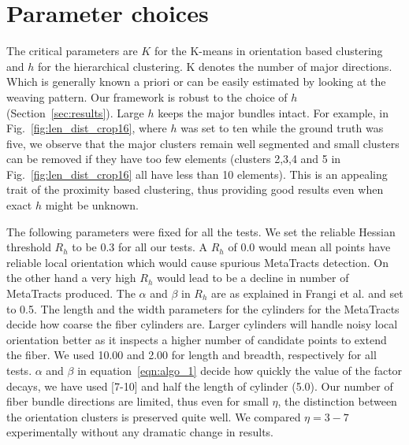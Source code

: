 \section{Parameter choices}
\label{sec:param_choices}
The critical parameters are $K$ for the K-means in orientation based clustering and $h$ for the hierarchical clustering. K denotes the number of major directions. Which is generally known a priori or can be easily estimated by looking at the weaving pattern. 
Our framework is robust to the choice of $h$ (Section~\ref{sec:results}). Large $h$ keeps the major bundles intact. For example, in  Fig.~\ref{fig:len_dist_crop16}, where $h$ was set to ten while the ground truth was five, we observe that the major clusters remain well segmented and small clusters can be removed if they have too few elements (clusters 2,3,4 and 5 in Fig.~\ref{fig:len_dist_crop16} all have less than 10 elements). This is an appealing trait of the proximity based clustering, thus providing good results even when exact $h$ might be unknown.

The following parameters were fixed for all the tests. We set the reliable Hessian threshold $R_{h}$ to be 0.3 for all our tests. A $R_{h}$ of 0.0 would mean all points have reliable local orientation which would cause spurious MetaTracts detection. On the other hand a very high $ R_{h}$ would lead to be a decline in number of MetaTracts produced. The $\alpha$ and $\beta$ in $R_{h}$ are as explained in Frangi et al. \cite{Frangi1998} and set to 0.5. The length and the width parameters for the cylinders for the MetaTracts decide how coarse the fiber cylinders are. Larger cylinders will handle noisy local orientation better as it inspects a higher number of candidate points to extend the fiber. We used 10.00 and 2.00 for length and breadth, respectively for all tests. $\alpha$ and $\beta$ in equation~\ref{eqn:algo_1} decide how quickly the value of the factor decays, we have used [7-10] and half the length of cylinder (5.0). Our number of fiber bundle directions are limited, thus even for small $\eta$, the distinction between  the orientation clusters is preserved quite well. We compared  $\eta=3-7$ experimentally without any dramatic change in results. 

